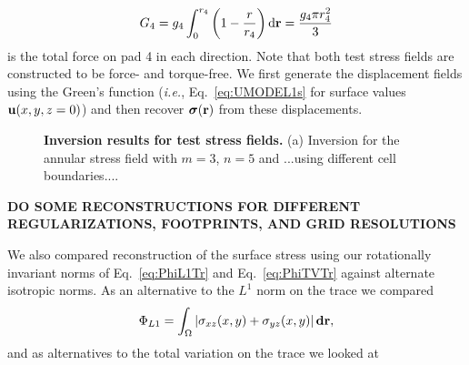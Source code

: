 \documentclass[aps,prl,reprint,twocolumn,groupedaddress,showpacs]{revtex4}
\newcommand{\bsigma}{{\boldsymbol\sigma}}
\def\d{{\bf d}}
\def\dd{\mbox{d}}
\def\r{{\bf r}}
\def\u{{\bf u}}
\begin{document}
\begin{equation}
G_{4} = g_{4}\int_{0}^{r_{4}}\left(1-{r\over r_{4}}\right) \dd \r = {g_{4}\pi r_{4}^{2}\over 3}
\end{equation}
%
is the total force on pad 4 in each direction. Note that both test
stress fields are constructed to be force- and torque-free. We first
generate the displacement fields using the Green's function 
(\textit{i.e.}, Eq.~\ref{eq:UMODEL1s} for surface values $\u(x,y,z=0)$)
and then recover $\bsigma(\r)$ from these displacements.

\begin{figure}[t]
\begin{center}
%
\caption{\textbf{Inversion results for test stress fields.} (a)
  Inversion for the annular stress field with $m=3$, $n=5$ and
  ...using different cell boundaries.... }
\label{RESULTS_TEST}
\end{center}
\end{figure}

\vspace{1cm}
{\bf DO SOME RECONSTRUCTIONS FOR DIFFERENT REGULARIZATIONS, FOOTPRINTS, AND GRID RESOLUTIONS}
\vspace{1cm}

We also compared reconstruction of the surface stress using our
rotationally invariant norms of Eq.~\ref{eq:PhiL1Tr} and
Eq.~\ref{eq:PhiTVTr} against alternate isotropic norms. As an
alternative to the $L^1$ norm on the trace we compared
\begin{equation}
\Phi_{L1} = \int_\Omega \left\vert \sigma_{xz}(x,y) +\sigma_{yz}(x,y) \right\vert\d\r,
\end{equation} 
and as alternatives to the total variation on the trace we looked at
\end{document}
